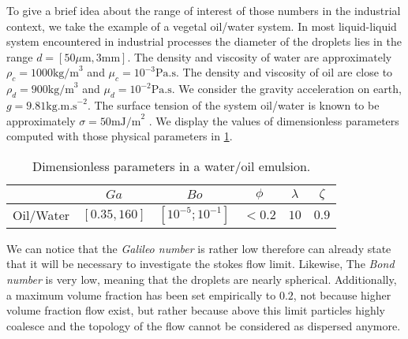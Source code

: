 To give a brief idea about the range of interest of those numbers in the industrial context, we take the example of a vegetal oil/water system.
In most liquid-liquid system encountered in industrial processes the diameter of the droplets lies in the range $d = [50 \mu \text{m}, 3 \text{mm}]$.
The density and viscosity of water are approximately $\rho_c = 1000 \text{kg/m}^3$ and $\mu_c = 10^{-3} \text{Pa.s}$.
The density and viscosity of oil are close to $\rho_d = 900 \text{kg/m}^3$ and $\mu_d = 10^{-2} \text{Pa.s}$.
We consider the gravity acceleration on earth, $g= 9.81 \text{kg.m.s}^{-2}$.
The surface tension of the system oil/water is known to be approximately $\sigma = 50 \text{mJ/m}^2$ \citep{de2015gouttes}. 
We display the values of dimensionless parameters computed with those physical parameters in \ref{tab:parameters_exp}.
\begin{table}[h!]
    \centering
    \caption{Dimensionless parameters in a water/oil emulsion.}
    \begin{tabular}{|c||c|c|c|c|c|}
        \hline&$Ga$&$Bo$&$\phi$&$\lambda$&$\zeta$\\ \hline
        \hline Oil/Water&$[0.35,160]$&$[10^{-5};10^{-1}]$&$<0.2$&$10$&$0.9$\\ \hline
    \end{tabular}
    \label{tab:parameters_exp}
\end{table}
We can notice that the \textit{Galileo number} is rather low therefore can already state that it will be necessary to investigate the stokes flow limit. 
Likewise, The \textit{Bond number} is very low, meaning that the droplets are nearly spherical.
Additionally, a maximum volume fraction has been set empirically to $0.2$, not because higher volume fraction flow exist, but rather because above this limit particles highly coalesce and the topology of the flow cannot be considered as dispersed anymore. 


